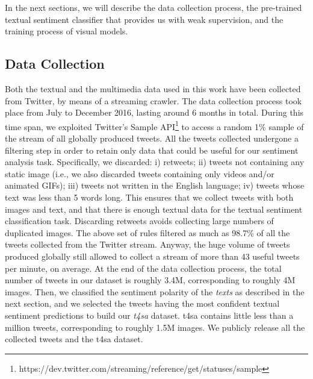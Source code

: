 In the next sections, we will describe the data collection process, the pre-trained textual sentiment classifier that provides us with weak supervision, and the training process of visual models.



\subsection{Data Collection}
\label{subsec:vsa:dataset}
Both the textual and the multimedia data used in this work have been collected from Twitter, by means of a streaming crawler.
The data collection process took place from July to December 2016, lasting around 6 months in total.
During this time span, we exploited Twitter's Sample API\footnote{https://dev.twitter.com/streaming/reference/get/statuses/sample} to access a random 1\% sample of the stream of all globally produced tweets.
All the tweets collected undergone a filtering step in order to retain only data that could be useful for our sentiment analysis task.
Specifically, we discarded: i) retweets; ii) tweets not containing any static image (i.e., we also discarded tweets containing only videos and/or animated GIFs); iii) tweets not written in the English language; iv) tweets whose text was less than 5 words long.
This ensures that we collect tweets with both images and text, and that there is enough textual data for the textual sentiment classification task.
Discarding retweets avoids collecting large numbers of duplicated images.
The above set of rules filtered as much as 98.7\% of all the tweets collected from the Twitter stream.
Anyway, the huge volume of tweets produced globally still allowed to collect a stream of more than 43 useful tweets per minute, on average.
At the end of the data collection process, the total number of tweets in our dataset is roughly 3.4M, corresponding to roughly 4M images.
Then, we classified the sentiment polarity of the \emph{texts} as described in the next section, and we selected the tweets having the most confident textual sentiment predictions to build our \emph{\acrfull{t4sa}} dataset.
\gls{t4sa} contains little less than a million tweets, corresponding to roughly 1.5M images.
We publicly release all the collected tweets and the \gls{t4sa} dataset.

